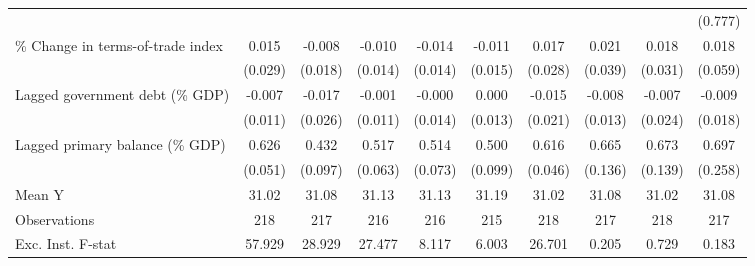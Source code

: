 {\begin{tabular}{l*{9}{c}}
                    &                     &                     &                     &                     &                     &                     &                     &                     &     (0.777)         \\
\addlinespace
\% Change in terms-of-trade index&       0.015         &      -0.008         &      -0.010         &      -0.014         &      -0.011         &       0.017         &       0.021         &       0.018         &       0.018         \\
                    &     (0.029)         &     (0.018)         &     (0.014)         &     (0.014)         &     (0.015)         &     (0.028)         &     (0.039)         &     (0.031)         &     (0.059)         \\
\addlinespace
Lagged government debt (\% GDP)&      -0.007         &      -0.017         &      -0.001         &      -0.000         &       0.000         &      -0.015         &      -0.008         &      -0.007         &      -0.009         \\
                    &     (0.011)         &     (0.026)         &     (0.011)         &     (0.014)         &     (0.013)         &     (0.021)         &     (0.013)         &     (0.024)         &     (0.018)         \\
\addlinespace
Lagged primary balance (\% GDP)&       0.626\sym{***}&       0.432\sym{***}&       0.517\sym{***}&       0.514\sym{***}&       0.500\sym{***}&       0.616\sym{***}&       0.665\sym{***}&       0.673\sym{***}&       0.697\sym{***}\\
                    &     (0.051)         &     (0.097)         &     (0.063)         &     (0.073)         &     (0.099)         &     (0.046)         &     (0.136)         &     (0.139)         &     (0.258)         \\
\midrule
Mean Y              &       31.02         &       31.08         &       31.13         &       31.13         &       31.19         &       31.02         &       31.08         &       31.02         &       31.08         \\
Observations        &         218         &         217         &         216         &         216         &         215         &         218         &         217         &         218         &         217         \\
Exc. Inst. F-stat   &      57.929         &      28.929         &      27.477         &       8.117         &       6.003         &      26.701         &       0.205         &       0.729         &       0.183         \\
\bottomrule
\end{tabular}
}

